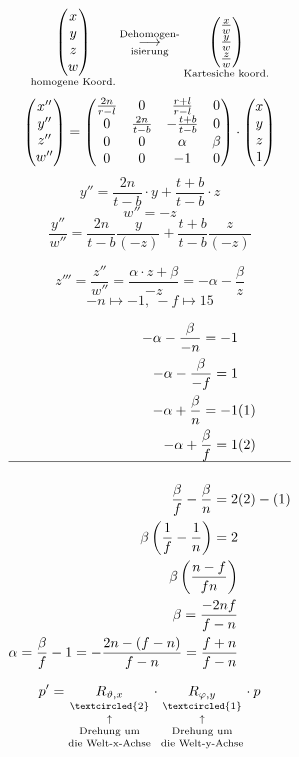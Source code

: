 \[ \underset{\text{homogene Koord.}}{\begin{pmatrix}x\\y\\z\\w\end{pmatrix}}\overset{\text{Dehomogen-}}{\underset{\text{isierung}}{\longrightarrow}}\underset{\text{Kartesiche koord.}}{\begin{pmatrix}\frac{x}{w}\\ \frac{y}{w}\\ \frac{z}{w}\end{pmatrix}} \]
\[ \begin{pmatrix}x''\\ y''\\ z''\\ w''\end{pmatrix} = \begin{pmatrix}\frac{2n}{r-l} & 0 & \frac{r+l}{r-l} & 0 \\0 & \frac{2n}{t-b} & -\frac{t+b}{t-b} & 0 \\ 0& 0&\alpha &\beta \\ 0&0&-1&0   \end{pmatrix} \cdot \begin{pmatrix}x\\y\\z\\1\end{pmatrix} \]
\[ y'' = \frac{2n}{t-b}\cdot y + \frac{t + b}{t- b}\cdot z \]
\[ w'' = -z \]
\[ \frac{y''}{w''} = \frac{2n}{t-b}\frac{y}{(-z)} + \frac{t+b}{t-b}\frac{z}{(-z)} \]

\[ z''' = \frac{z''}{w''} = \frac{\alpha\cdot z + \beta}{- z} = -\alpha-\frac{\beta}{z} \]
\[ -n\mapsto -1,~-f \mapsto 15 \]

\begin{align*}
 -\alpha- \frac{\beta}{-n} = -1& \\ 
 -\alpha-\frac{\beta}{-f} = 1 & \\
 -\alpha + \frac{\beta}{n} = -1 &(1)\\
 -\alpha+\frac{\beta}{f} = 1&(2)\\
\hline\\
\frac{\beta}{f} - \frac{\beta}{n} = 2 &(2)-(1)\\
\beta\left( \frac{1}{f}-\frac{1}{n} \right) = 2& \\
\beta\left(\frac{n-f}{fn}\right)& \\
\beta = \frac{-2nf}{f-n}& \\
\alpha = \frac{\beta}{f} - 1 = -\frac{2n-(f-n)}{f-n} = \frac{f+n}{f-n}&
\end{align*}

\[ p' = \underset{\text{die Welt-x-Achse}}{\underset{\text{Drehung um}}{\underset{\uparrow}{\underset{\footnotesize\textcircled{2}}{R_{\vartheta, x}}}}} \cdot \underset{\text{die Welt-y-Achse}}{\underset{\text{Drehung um}}{\underset{\uparrow}{\underset{\footnotesize\textcircled{1}}{R_{\varphi, y}}}}}\cdot p \]

